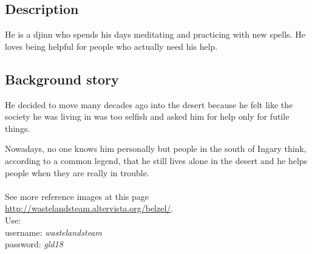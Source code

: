 \subsection{Description}
He is a djinn who spends his days meditating and practicing with new spells. He loves being helpful for people who actually need his help.

\subsection{Background story}
He decided to move many decades ago into the desert because he felt like the society he was living in was too selfish and asked him for help only for futile things.

Nowadays, no one knows him personally but people in the south of Ingary think, according to a common legend, that he still lives alone in the desert and he helps people when they are really in trouble.\\\\
See more reference images at this page \href{http://wastelandsteam.altervista.org/belzel/}{http://wastelandsteam.altervista.org/belzel/}.\\
Use:\\
username: \textit{wastelandsteam}\\
password: \textit{gld18}
